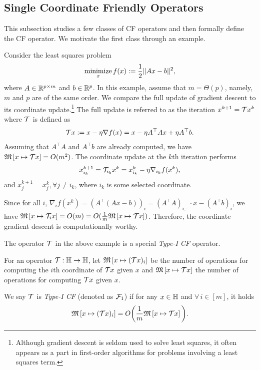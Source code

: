 \subsection{Single Coordinate Friendly Operators}
This subsection studies a few classes of CF operators and then formally define the CF operator. We motivate the first class through an example.
\begin{example}\label{ex:lsq1}
Consider the least squares problem
\begin{equation}
\Min_{x} f(x):=\frac{1}{2} \|A x - b\|^2,\label{lsq}
\end{equation}
where $A \in \mathbb{R}^{p \times m}$ and $b \in \mathbb{R}^p$. In this example, assume that $m=\Theta(p)$, namely, $m$ and $p$ are of the same order.  We compare the full update of gradient descent to its coordinate update.\footnote{Although gradient descent is seldom used to solve least squares, it often appears as a part in first-order algorithms for problems involving a least squares term.}
The full update is referred to as the iteration
$x^{k+1}= {\mathcal{T}} x^k $ where ${\mathcal{T}}$ is defined as
\begin{equation}
\cT x:=x-\eta\nabla f(x)=x-\eta A^\top Ax + \eta A^\top b.
\end{equation}
Assuming that $ A^\top A$ and $ A^\top b$ are already computed, we have $\mathfrak{M}\left[{x}\mapsto {{\mathcal{T}}x}\right]=O(m^2)$. The coordinate update at the $k$th iteration performs
$$x_{i_k}^{k+1}={\mathcal{T}}_{i_k} x^k =x^k_{i_k}-\eta\nabla_{i_k} f(x^k),$$
and $x_j^{k+1}=x_j^{k},\forall j\neq i_k$, where $i_k$ is some selected coordinate.

Since for all $i$, $\nabla_i f(x^k)=\left(A^\top (Ax-b)\right)_{i}=(A^\top A)_{i,:}\cdot x-(A^\top b)_{i}$,
we have $\mathfrak{M}\left[{x}\mapsto {{\mathcal{T}}_i x }\right]=O(m)=O(\frac{1}{m}\mathfrak{M}\left[{x}\mapsto {{\mathcal{T}}x}\right])$. Therefore, the coordinate gradient descent is computationally worthy.
\end{example}
The operator ${\mathcal{T}}$ in the above example is a special \emph{Type-I CF} operator.
\begin{definition}[Type-I CF]
For an operator ${\mathcal{T}}: \mathbb{H}\to\mathbb{H}$, let $\mathfrak{M}\left[{x}\mapsto {({\mathcal{T}}x)_i}\right]$ be the number of operations for computing the $i$th coordinate of ${\mathcal{T}} x$ given $x$ and $\mathfrak{M}\left[{x}\mapsto {{\mathcal{T}}x}\right]$ the number of operations for computing ${\mathcal{T}} x$ given $x$.

We say ${\mathcal{T}}$ is \emph{Type-I CF} (denoted as ${\mathcal{F}}_1$) if for any $x\in\mathbb{H}$ and $\forall\, i\in [m]$, it holds
$$\mathfrak{M}\left[{x}\mapsto {({\mathcal{T}}x)_i}\right]= O\bigg(\frac{1}{m}\mathfrak{M}\left[{x}\mapsto {{\mathcal{T}}x}\right]\bigg).$$
\end{definition}
